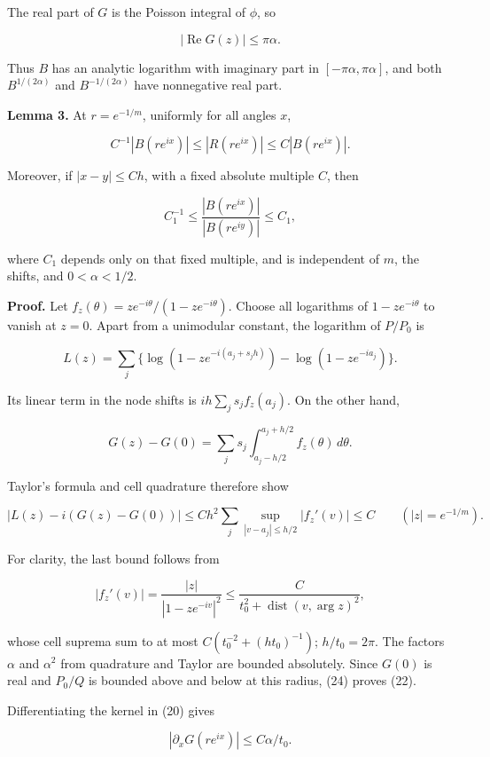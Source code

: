 \documentclass[10pt,a4paper]{article}
\begin{document}
The real part of \(G\) is the Poisson integral of \(\phi\), so

\nopagebreak[4]
\[|\operatorname{Re}G(z)|\le\pi\alpha. \tag{21}\]

Thus \(B\) has an analytic logarithm with imaginary part in
\([-\pi\alpha,\pi\alpha]\), and both \(B^{1/(2\alpha)}\) and
\(B^{-1/(2\alpha)}\) have nonnegative real part.

\textbf{Lemma 3.} At \(r=e^{-1/m}\), uniformly for all angles \(x\),

\nopagebreak[4]
\[C^{-1}|B(re^{ix})|\le|R(re^{ix})|\le C|B(re^{ix})|. \tag{22}\]

Moreover, if \(|x-y|\le Ch\), with a fixed absolute multiple \(C\), then

\nopagebreak[4]
\[C_1^{-1}\le\frac{|B(re^{ix})|}{|B(re^{iy})|}\le C_1, \tag{23}\]

where \(C_1\) depends only on that fixed multiple, and is independent of
\(m\), the shifts, and \(0<\alpha<1/2\).

\textbf{Proof.} Let \(f_z(\theta)=ze^{-i\theta}/(1-ze^{-i\theta})\).
Choose all logarithms of \(1-ze^{-i\theta}\) to vanish at \(z=0\). Apart
from a unimodular constant, the logarithm of \(P/P_0\) is

\nopagebreak[4]
\[L(z)=\sum_j\{\log(1-ze^{-i(a_j+s_jh)})-\log(1-ze^{-ia_j})\}.\]

Its linear term in the node shifts is \(ih\sum_j s_j f_z(a_j)\). On the
other hand,

\nopagebreak[4]
\[G(z)-G(0)=\sum_j s_j\int_{a_j-h/2}^{a_j+h/2} f_z(\theta)\,d\theta.\]

Taylor's formula and cell quadrature therefore show

\nopagebreak[4]
\[|L(z)-i(G(z)-G(0))|
 \le C h^2\sum_j\sup_{|v-a_j|\le h/2}|f_z'(v)|\le C
       \qquad(|z|=e^{-1/m}). \tag{24}\]

For clarity, the last bound follows from

\nopagebreak[4]
\[|f_z'(v)|=\frac{|z|}{|1-ze^{-iv}|^2}
 \le \frac C{t_0^2+\operatorname{dist}(v,\arg z)^2},\]

whose cell suprema sum to at most \(C(t_0^{-2}+(ht_0)^{-1})\);
\(h/t_0=2\pi\). The factors \(\alpha\) and \(\alpha^2\) from quadrature
and Taylor are bounded absolutely. Since \(G(0)\) is real and \(P_0/Q\)
is bounded above and below at this radius, (24) proves (22).

Differentiating the kernel in (20) gives

\nopagebreak[4]
\[|\partial_xG(re^{ix})|\le C\alpha/t_0.\]
\end{document}
